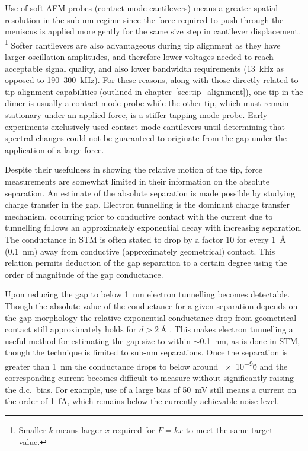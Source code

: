 \documentclass[a4paper]{article}
\begin{document}
Use of soft AFM probes (contact mode cantilevers) means a greater spatial resolution in the sub-nm regime since the force required to push through the meniscus is applied more gently for the same size step in cantilever displacement.%
\footnote{Smaller $k$ means larger $x$ required for $F=kx$ to meet the same target value.}
Softer cantilevers are also advantageous during tip alignment as they have larger oscillation amplitudes, and therefore lower voltages needed to reach acceptable signal quality, and also lower bandwidth requirements (\SI{13}{kHz} as opposed to 190--\SI{300}{kHz}).
For these reasons, along with those directly related to tip alignment capabilities (outlined in chapter~\ref{sec:tip_alignment}), one tip in the dimer is usually a contact mode probe while the other tip, which must remain stationary under an applied force, is a stiffer tapping mode probe. Early experiments exclusively used contact mode cantilevers until determining that spectral changes could not be guaranteed to originate from the gap under the application of a large force.

Despite their usefulness in showing the relative motion of the tip, force measurements are somewhat limited in their information on the absolute separation. An estimate of the absolute separation is made possible by studying charge transfer in the gap.
Electron tunnelling is the dominant charge transfer mechanism, occurring prior to conductive contact with the current due to tunnelling follows an approximately exponential decay with increasing separation. The conductance in STM is often stated to drop by a factor 10 for every \SI{1}{\angstrom} (\SI{0.1}{nm}) away from conductive (approximately geometrical) contact. This relation permits deduction of the gap separation to a certain degree using the order of magnitude of the gap conductance.

Upon reducing the gap to below \SI{1}{nm} electron tunnelling becomes detectable. Though the absolute value of the conductance for a given separation depends on the gap morphology the relative exponential conductance drop from geometrical contact still approximately holds for $d>\SI{2}{\angstrom}$ \cite{esteban2015}. This makes electron tunnelling a useful method for estimating the gap size to within $\sim$\SI{0.1}{nm}, as is done in STM, though the technique is limited to sub-nm separations. Once the separation is greater than \SI{1}{nm} the conductance drops to below around \num{e-9}\G0 and the corresponding current becomes difficult to measure without significantly raising the d.c.\ bias. For example, use of a large bias of \SI{50}{mV} still means a current on the order of \SI{1}{fA}, which remains below the currently achievable noise level.
\end{document}
